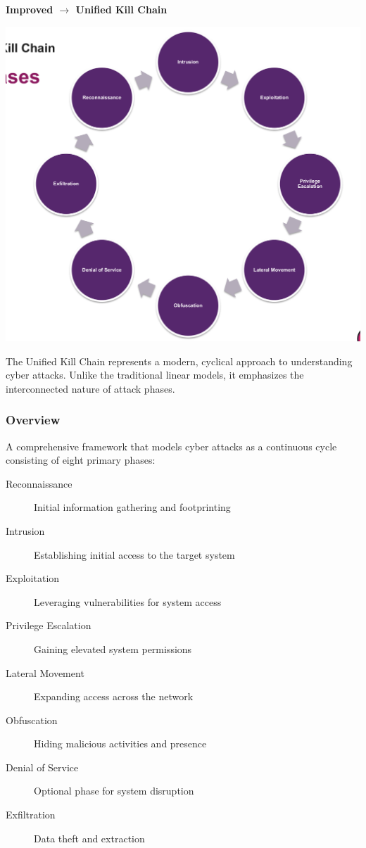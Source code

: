 \textbf{Improved $\rightarrow$ Unified Kill Chain}

\begin{center}
\includegraphics[width=\textwidth]{resources/09-cyber-kill-chain-improved.png}
\end{center}

The Unified Kill Chain represents a modern, cyclical approach to understanding cyber attacks. Unlike the traditional linear models, it emphasizes the interconnected nature of attack phases.

\subsubsection{Overview}
A comprehensive framework that models cyber attacks as a continuous cycle consisting of eight primary phases:

\begin{description}
   \item[Reconnaissance] Initial information gathering and footprinting
   \item[Intrusion] Establishing initial access to the target system
   \item[Exploitation] Leveraging vulnerabilities for system access
   \item[Privilege Escalation] Gaining elevated system permissions
   \item[Lateral Movement] Expanding access across the network
   \item[Obfuscation] Hiding malicious activities and presence
   \item[Denial of Service] Optional phase for system disruption
   \item[Exfiltration] Data theft and extraction
\end{description}


